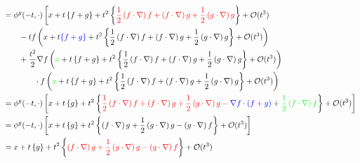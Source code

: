 \begin{equation*}
\begin{aligned}
           & = \phi^g(-t,\cdot) \left[ x + t \left\{ f + g \right\} + t^2 \left\{ \textcolor{red}{\frac{1}{2} \left( f \cdot \nabla\right) f +  \left( f \cdot \nabla \right) g + \frac{1}{2} \left( g \cdot \nabla \right) g }  \right\} + \mathcal O(t^3) \right.                                                                                                          \\
           & \qquad - t f \left( x + t \textcolor{blue}{\left\{ f + g \right\}} + t^2 \left\{ \frac{1}{2} \left( f \cdot \nabla\right) f +  \left( f \cdot \nabla \right) g + \frac{1}{2} \left( g \cdot \nabla \right) g   \right\} + \mathcal O(t^3) \right)                                                                                                               \\
           & \qquad + \frac{t^2}{2} \nabla f \left( \textcolor{green}{x} + t \left\{ f + g \right\} + t^2 \left\{ \frac{1}{2} \left( f \cdot \nabla\right) f +  \left( f \cdot \nabla \right) g + \frac{1}{2} \left( g \cdot \nabla \right) g   \right\} + \mathcal O(t^3) \right)                                                                                           \\
           & \qquad \qquad \cdot f \left( \textcolor{green}{x} + t \left\{ f + g \right\} + t^2 \left\{ \frac{1}{2} \left( f \cdot \nabla\right) f +  \left( f \cdot \nabla \right) g + \frac{1}{2} \left( g \cdot \nabla \right) g  \right\} + \mathcal O(t^3) \right)                                                                                                      \\
           & =  \phi^g(-t,\cdot) \left[ x + t \left\{ g \right\} + t^2 \left\{ \textcolor{red}{\frac{1}{2} \left( f \cdot \nabla\right) f +  \left( f \cdot \nabla \right) g  + \frac{1}{2} \left( g \cdot \nabla \right) g } - \textcolor{blue}{\nabla f \cdot (f+g)}  + \textcolor{green}{ \frac{1}{2} \left( f \cdot \nabla\right) f } \right\} + \mathcal O(t^3) \right] \\
           & = \phi^g(-t,\cdot) \left[ x + t \left\{ g \right\} + t^2 \left\{  \left( f \cdot \nabla \right) g  + \frac{1}{2} \left( g \cdot \nabla \right) g  - \left(g \cdot \nabla \right) f   \right\} + \mathcal O(t^3) \right]                                                                                                                                         \\
           & = x + t \left\{ g \right\} + t^2 \left\{ \textcolor{red}{ \left( f \cdot \nabla \right) g  + \frac{1}{2} \left( g \cdot \nabla \right) g  - \left(g \cdot \nabla \right) f }  \right\} + \mathcal O(t^3)                                                                                                                                                        \\

\end{aligned}
\end{equation*}
